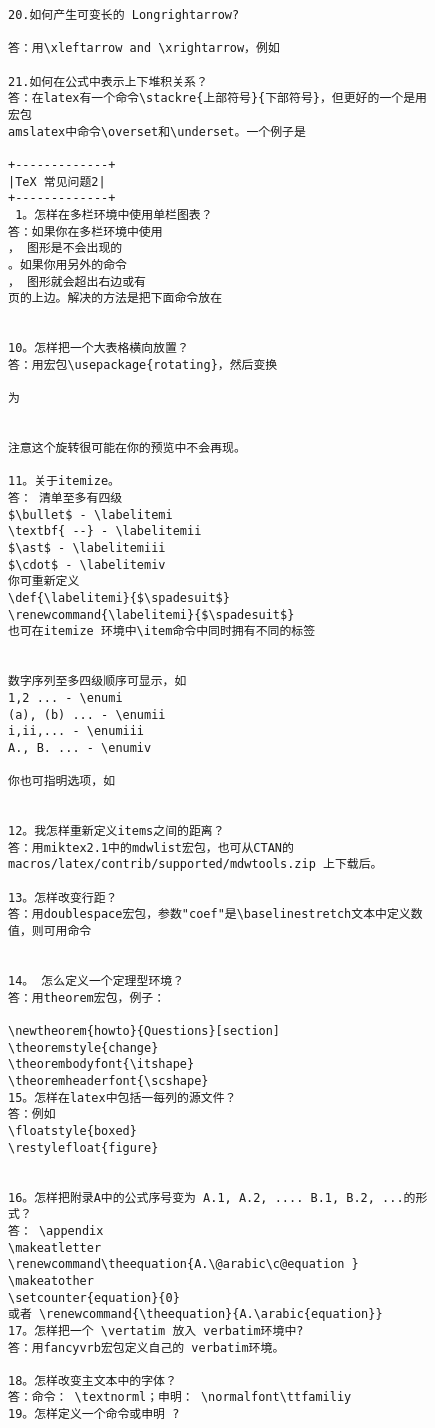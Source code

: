 \begin{center}
\begin{figure}[t]
\begin{verbatim}
20.如何产生可变长的 Longrightarrow? 
 
答：用\xleftarrow and \xrightarrow，例如 

21.如何在公式中表示上下堆积关系？ 
答：在latex有一个命令\stackre{上部符号}{下部符号}，但更好的一个是用宏包 
amslatex中命令\overset和\underset。一个例子是 

+-------------+ 
|TeX 常见问题2| 
+-------------+ 
 1。怎样在多栏环境中使用单栏图表？ 
答：如果你在多栏环境中使用
， 图形是不会出现的 
。如果你用另外的命令
， 图形就会超出右边或有 
页的上边。解决的方法是把下面命令放在

 
10。怎样把一个大表格横向放置？ 
答：用宏包\usepackage{rotating}，然后变换 

为 

 
注意这个旋转很可能在你的预览中不会再现。 
 
11。关于itemize。 
答： 清单至多有四级 
$\bullet$ - \labelitemi 
\textbf{ --} - \labelitemii 
$\ast$ - \labelitemiii 
$\cdot$ - \labelitemiv 
你可重新定义 
\def{\labelitemi}{$\spadesuit$} 
\renewcommand{\labelitemi}{$\spadesuit$} 
也可在itemize 环境中\item命令中同时拥有不同的标签 

 
数字序列至多四级顺序可显示，如 
1,2 ... - \enumi 
(a), (b) ... - \enumii 
i,ii,... - \enumiii 
A., B. ... - \enumiv 
 
你也可指明选项，如 

 
12。我怎样重新定义items之间的距离？ 
答：用miktex2.1中的mdwlist宏包，也可从CTAN的 
macros/latex/contrib/supported/mdwtools.zip 上下载后。 
 
13。怎样改变行距？ 
答：用doublespace宏包，参数"coef"是\baselinestretch文本中定义数值，则可用命令 

 
14。 怎么定义一个定理型环境？ 
答：用theorem宏包，例子： 
 
\newtheorem{howto}{Questions}[section] 
\theoremstyle{change} 
\theorembodyfont{\itshape} 
\theoremheaderfont{\scshape} 
15。怎样在latex中包括一每列的源文件？ 
答：例如 
\floatstyle{boxed} 
\restylefloat{figure} 

 
16。怎样把附录A中的公式序号变为 A.1, A.2, .... B.1, B.2, ...的形式？ 
答： \appendix 
\makeatletter 
\renewcommand\theequation{A.\@arabic\c@equation } 
\makeatother 
\setcounter{equation}{0} 
或者 \renewcommand{\theequation}{A.\arabic{equation}} 
17。怎样把一个 \vertatim 放入 verbatim环境中? 
答：用fancyvrb宏包定义自己的 verbatim环境。 
 
18。怎样改变主文本中的字体？ 
答：命令： \textnorml；申明： \normalfont\ttfamiliy 
19。怎样定义一个命令或申明 ? 
 

\end{verbatim}
\end{figure}
\end{center}
